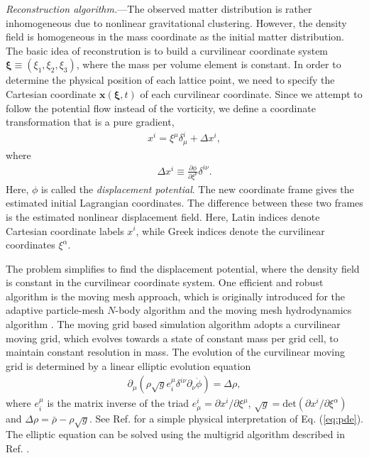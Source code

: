 \documentclass[aps,prl,twocolumn,showpacs,superscriptaddress,groupedaddress,nofootinbib]{revtex4}  %
\newcommand{\mr}{\mathrm}
\newcommand{\bea}{\begin{eqnarray}}
\newcommand{\eea}{\end{eqnarray}}
\begin{document}
{\it Reconstruction algorithm.}---The observed matter distribution is rather 
inhomogeneous due to nonlinear gravitational clustering. 
However, the density field is homogeneous in the mass coordinate as
the initial matter distribution.
The basic idea of reconstrution is to build a curvilinear 
coordinate system $\bm{\xi}\equiv(\xi_1,\xi_2,\xi_3)$, where the mass per
volume element is constant. 
In order to determine the physical position of each lattice point, we need to 
specify the Cartesian coordinate $\bm{x}(\bm{\xi},t)$ of each curvilinear 
coordinate.
Since we attempt to follow the potential flow instead of the vorticity, we 
define a coordinate transformation that is a pure gradient,
\bea
\label{eq:trs}
x^i=\xi^\mu\delta^i_\mu+\Delta x^i,
\eea
where
\bea
\Delta x^i\equiv\frac{\partial\phi}{\partial\xi^\nu}\delta^{i\nu}.
\eea
Here, $\phi$ is called the {\it displacement potential}. 
The new coordinate frame gives the estimated initial Lagrangian coordinates. 
The difference between these two frames is the estimated nonlinear displacement field.
Here, Latin indices denote Cartesian coordinate labels $x^i$, while Greek 
indices denote the curvilinear coordinates $\xi^\alpha$.

The problem simplifies to find the displacement potential, where the density field
is constant in the curvilinear coordinate system.
One efficient and robust algorithm is the moving mesh approach, which
is originally introduced for the adaptive particle-mesh $N$-body 
algorithm \cite{1995ApJS..100..269P} and the moving mesh hydrodynamics algorithm
\cite{1998ApJS..115...19P}. 
The moving grid based simulation algorithm adopts a curvilinear moving grid,
which evolves towards a state of constant mass per grid cell, to maintain constant
resolution in mass.
The evolution of the curvilinear moving grid is determined by a linear elliptic
evolution equation
\bea
\label{eq:pde}
\partial_\mu(\rho\sqrt{g}e^\mu_i\delta^{i\nu}\partial_\nu\dot{\phi})=\Delta\rho,
\eea
where $e^\mu_i$ is the matrix inverse of the triad $e^i_\mu=\partial x^i/\partial\xi^\mu$, $\sqrt{g}=\mr{det}(\partial x^i/\partial \xi^\alpha)$ and 
$\Delta\rho=\bar{\rho}-\rho\sqrt{g}$. 
See Ref. \cite{1995ApJS..100..269P} for a simple physical interpretation of 
Eq. (\ref{eq:pde}).
The elliptic equation can be solved using the multigrid algorithm described 
in Ref. \cite{1995ApJS..100..269P}.
\end{document}
